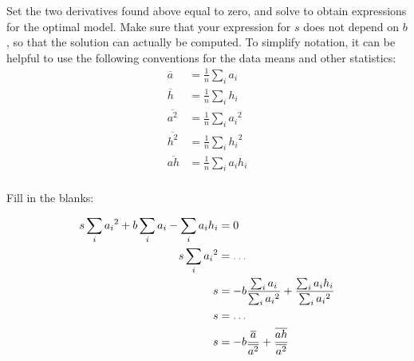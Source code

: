 \documentclass[11pt]{article}
\begin{document}
\begin{Exercise}
\noindent Set the two derivatives found above equal to zero, and solve to obtain expressions for the optimal model. Make sure that your expression for $s$ does not depend on $b$, so that the solution can actually be computed. 
To simplify notation, it can be helpful to use the following conventions for the data means and other statistics:
\begin{align*}
\overline{a} &= \frac{1}{n}\sum_i a_i	\\
\overline{h} &= \frac{1}{n}\sum_i h_i	\\
\overline{a^2} &= \frac{1}{n}\sum_i {a_i}^2	\\
\overline{h^2} &= \frac{1}{n}\sum_i {h_i}^2	\\
\overline{ah} &= \frac{1}{n}\sum_i a_ih_i	\\
\end{align*}

Fill in the blanks:

\begin{align}
	s \sum_i {a_i}^2 + b \sum_ia_i - \sum_i a_i h_i &= 0 \notag\\
	s \sum_i {a_i}^2 &= \ans{- b \sum_ia_i + \sum_i a_i h_i}{\dots} \notag\\
	s &= - b \frac{\sum_i a_i}{\sum_i{a_i}^2} + \frac{\sum_i a_i h_i}{\sum_i{a_i}^2} \notag \\
	s &= \ans{- b \frac{\frac{1}{n}\sum_i a_i}{\frac{1}{n}\sum_i{a_i}^2} + \frac{\frac{1}{n}\sum_i a_i h_i}{\frac{1}{n}\sum_i{a_i}^2}}{\ldots} \notag\\
	s &= -b\frac{\overline{a}}{\overline{a^2}} + \frac{\overline{ah}}{\overline{a^2}} \label{line:s}
\end{align}


\end{Exercise}
\end{document}
